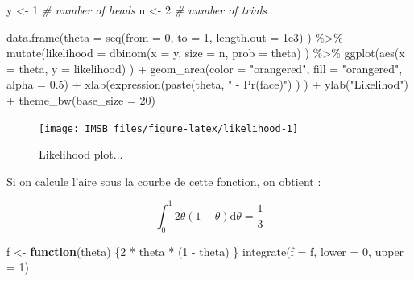 \documentclass[
  a4paper,11pt,twoside,onecolumn,openright,final,oldfontcommands]{memoir}
\newenvironment{Shaded}{\begin{snugshade}}{\end{snugshade}}
\newcommand{\AttributeTok}[1]{\textcolor[rgb]{0.77,0.63,0.00}{#1}}
\newcommand{\CommentTok}[1]{\textcolor[rgb]{0.56,0.35,0.01}{\textit{#1}}}
\newcommand{\ControlFlowTok}[1]{\textcolor[rgb]{0.13,0.29,0.53}{\textbf{#1}}}
\newcommand{\DecValTok}[1]{\textcolor[rgb]{0.00,0.00,0.81}{#1}}
\newcommand{\FloatTok}[1]{\textcolor[rgb]{0.00,0.00,0.81}{#1}}
\newcommand{\FunctionTok}[1]{\textcolor[rgb]{0.00,0.00,0.00}{#1}}
\newcommand{\NormalTok}[1]{#1}
\newcommand{\OtherTok}[1]{\textcolor[rgb]{0.56,0.35,0.01}{#1}}
\newcommand{\SpecialCharTok}[1]{\textcolor[rgb]{0.00,0.00,0.00}{#1}}
\newcommand{\StringTok}[1]{\textcolor[rgb]{0.31,0.60,0.02}{#1}}
\theoremstyle{definition}
\theoremstyle{definition}
\theoremstyle{definition}
\theoremstyle{definition}
\theoremstyle{remark}
\begin{document}
\begin{Shaded}
\begin{Highlighting}[]
\NormalTok{y }\OtherTok{\textless{}{-}} \DecValTok{1} \CommentTok{\# number of heads}
\NormalTok{n }\OtherTok{\textless{}{-}} \DecValTok{2} \CommentTok{\# number of trials}

\FunctionTok{data.frame}\NormalTok{(}\AttributeTok{theta =} \FunctionTok{seq}\NormalTok{(}\AttributeTok{from =} \DecValTok{0}\NormalTok{, }\AttributeTok{to =} \DecValTok{1}\NormalTok{, }\AttributeTok{length.out =} \FloatTok{1e3}\NormalTok{) ) }\SpecialCharTok{\%\textgreater{}\%}
  \FunctionTok{mutate}\NormalTok{(}\AttributeTok{likelihood =} \FunctionTok{dbinom}\NormalTok{(}\AttributeTok{x =}\NormalTok{ y, }\AttributeTok{size =}\NormalTok{ n, }\AttributeTok{prob =}\NormalTok{ theta) ) }\SpecialCharTok{\%\textgreater{}\%}
  \FunctionTok{ggplot}\NormalTok{(}\FunctionTok{aes}\NormalTok{(}\AttributeTok{x =}\NormalTok{ theta, }\AttributeTok{y =}\NormalTok{ likelihood) ) }\SpecialCharTok{+}
  \FunctionTok{geom\_area}\NormalTok{(}\AttributeTok{color =} \StringTok{"orangered"}\NormalTok{, }\AttributeTok{fill =} \StringTok{"orangered"}\NormalTok{, }\AttributeTok{alpha =} \FloatTok{0.5}\NormalTok{) }\SpecialCharTok{+}
  \FunctionTok{xlab}\NormalTok{(}\FunctionTok{expression}\NormalTok{(}\FunctionTok{paste}\NormalTok{(theta, }\StringTok{" {-} Pr(face)"}\NormalTok{) ) ) }\SpecialCharTok{+} \FunctionTok{ylab}\NormalTok{(}\StringTok{"Likelihod"}\NormalTok{) }\SpecialCharTok{+}
  \FunctionTok{theme\_bw}\NormalTok{(}\AttributeTok{base\_size =} \DecValTok{20}\NormalTok{)}
\end{Highlighting}
\end{Shaded}

\begin{figure}[!htb]

{\centering \texttt{[image: IMSB\_files/figure-latex/likelihood-1]} 

}

\caption{Likelihood plot...}\label{fig:likelihood}
\end{figure}

Si on calcule l'aire sous la courbe de cette fonction, on obtient :

\[\int_{0}^{1} 2 \theta(1 - \theta) \mathrm{d} \theta = \frac{1}{3}\]

\begin{Shaded}
\begin{Highlighting}[]
\NormalTok{f }\OtherTok{\textless{}{-}} \ControlFlowTok{function}\NormalTok{(theta) \{}\DecValTok{2} \SpecialCharTok{*}\NormalTok{ theta }\SpecialCharTok{*}\NormalTok{ (}\DecValTok{1} \SpecialCharTok{{-}}\NormalTok{ theta) \}}
\FunctionTok{integrate}\NormalTok{(}\AttributeTok{f =}\NormalTok{ f, }\AttributeTok{lower =} \DecValTok{0}\NormalTok{, }\AttributeTok{upper =} \DecValTok{1}\NormalTok{)}
\end{Highlighting}
\end{Shaded}
\end{document}
